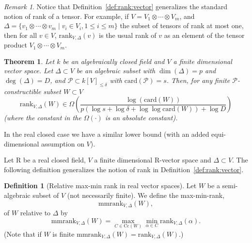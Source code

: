 \documentclass[10pt]{amsart}
\newtheorem{theorem}{Theorem}
\theoremstyle{definition}
\newtheorem{definition}{Definition}[section]
\theoremstyle{remark}
\newtheorem{remark}{Remark}
\numberwithin{equation}{section}
\newcommand {\R} {\mathrm{R}}
\newcommand{\card}{\mathrm{card}}
\newcommand{\rank}{\mathrm{rank}}
\newcommand{\Cc}{\mathrm{Cc}}
\newcommand{\mmrank}{\mathrm{mmrank}}
\begin{document}
\begin{remark}
    Notice that Definition~\ref{def:rank:vector} generalizes the standard notion of rank of a tensor. For example, if $V = V_1 \otimes \cdots \otimes V_m$, and $\Delta = \{v_1 \otimes \cdots \otimes v_m \mid v_i \in V_i, 1 \leq i \leq m\}$ the subset of tensors of rank at most one, then for all $v \in V$, $\rank_{V,\Delta}(v)$ is the usual rank of $v$ as an element of the tensor product  $V_1 \otimes \cdots \otimes V_m$.
\end{remark}



\begin{theorem}
\label{thm:rank:vector:algebraic}
Let $k$ be an algebraically closed field and $V$ a finite dimensional
vector space.
Let $\Delta \subset V$ be an algebraic subset with $\dim(\Delta) = p$ and $\deg(\Delta)  = D$, and 
$\mathcal{P} \subset k[V]_{\leq \delta}$ with $\card(\mathcal{P}) = s$.
Then, for any finite $\mathcal{P}$-constructible subset $W \subset V$ 
\begin{equation}
\label{eqn:thm:rank:vector:algebraic}
\rank_{V,\Delta} (W) \in  \Omega \left(\frac{\log(\card(W))}{p (\log s + \log \delta + \log \log \card(W)) + \log D }\right)
\end{equation}
(where the constant in the $\Omega(\cdot)$ is an absolute constant).
\end{theorem}

In the real closed case we have a similar lower bound (with
an added equi-dimensional assumption on $V$). 

Let $\R$ be a real closed field, $V$ a finite dimensional $\R$-vector space and 
$\Delta \subset V$.
The following definition generalizes the notion of rank in Definition~\ref{def:rank:vector}.


\begin{definition}[Relative max-min rank in real vector spaces]
\label{def:mmrank:V}
Let $W$ be a semi-algebraic subset of $V$ (not necessarily finite). 
We define the max-min-rank, 
\[
\mmrank_{V,\Delta}(W),
\]
of $W$ relative to $\Delta$ by
\[
\mmrank_{V,\Delta}(W) = \max_{C \in \Cc(W)} 
\min_{\alpha \in C} \rank_{V,\Delta}(\alpha).
\]
(Note that if $W$ is finite 
$\mmrank_{V,\Delta}(W) = \rank_{V,\Delta}(W)$.)
\end{definition}
\end{document}
